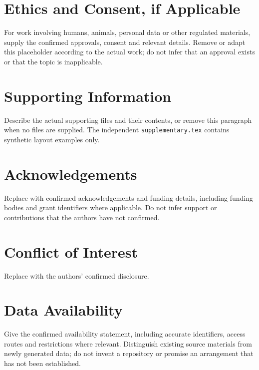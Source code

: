 \documentclass[a4paper,11pt]{article}
\begin{document}
\section*{Ethics and Consent, if Applicable}
For work involving humans, animals, personal data or other regulated
materials, supply the confirmed approvals, consent and relevant details.
Remove or adapt this placeholder according to the actual work; do not
infer that an approval exists or that the topic is inapplicable.

\section*{Supporting Information}
Describe the actual supporting files and their contents, or remove this
paragraph when no files are supplied. The independent
\texttt{supplementary.tex} contains synthetic layout examples only.

\section*{Acknowledgements}
Replace with confirmed acknowledgements and funding details, including
funding bodies and grant identifiers where applicable. Do not infer support
or contributions that the authors have not confirmed.

\section*{Conflict of Interest}
Replace with the authors' confirmed disclosure.

\section*{Data Availability}
Give the confirmed availability statement, including accurate identifiers,
access routes and restrictions where relevant. Distinguish existing source
materials from newly generated data; do not invent a repository or promise
an arrangement that has not been established.




\clearpage
\end{document}
